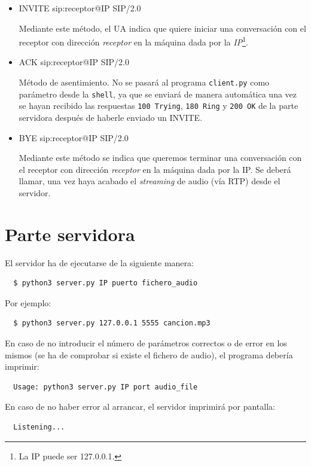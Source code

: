 \documentclass[a4paper,11pt]{article}
\begin{document}
  \begin{itemize}
    \item INVITE sip:receptor@IP SIP/2.0

    Mediante este método, el UA indica que quiere iniciar una conversación con el receptor con dirección \emph{receptor} en la máquina dada por la \emph{IP}\footnote{La IP puede ser 127.0.0.1.}.

    \item ACK sip:receptor@IP SIP/2.0

    Método de asentimiento. No se pasará al programa \texttt{client.py} como parámetro desde
la \texttt{shell}, ya que se enviará de manera automática una vez se hayan recibido las respuestas \texttt {100 Trying}, \texttt{180 Ring} y \texttt{200 OK} de la parte servidora después de haberle enviado un INVITE.

    \item BYE sip:receptor@IP SIP/2.0

    Mediante este método se indica que queremos terminar una conversación con el receptor con dirección \emph{receptor} en la máquina dada por la IP. Se deberá llamar, una vez haya acabado el \emph{streaming} de audio (vía RTP) desde el servidor.

  \end{itemize}


\section*{Parte servidora}

El servidor ha de ejecutarse de la siguiente manera:
\begin{verbatim}
  $ python3 server.py IP puerto fichero_audio
\end{verbatim}

Por ejemplo:
\begin{verbatim}
  $ python3 server.py 127.0.0.1 5555 cancion.mp3
\end{verbatim}

En caso de no introducir el número de parámetros correctos o de error en los mismos (se ha de comprobar si existe el fichero de audio), el programa debería imprimir:
\begin{verbatim}
  Usage: python3 server.py IP port audio_file
\end{verbatim}

En caso de no haber error al arrancar, el servidor imprimirá por pantalla:
\begin{verbatim}
  Listening...
\end{verbatim}
\end{document}
